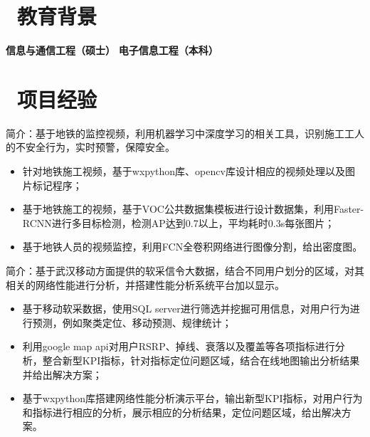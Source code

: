 \documentclass{resume}
\begin{document}



\section{\faGraduationCap\ \textbf{教育背景}}
 \qquad\qquad\textbf{信息与通信工程（硕士）}
 \qquad\qquad\textbf{电子信息工程（本科）}

\section{\faUsers\ \textbf{项目经验}}
\par{简介：基于地铁的监控视频，利用机器学习中深度学习的相关工具，识别施工工人的不安全行为，实时预警，保障安全。}
\begin{itemize}
  \item 针对地铁施工视频，基于wxpython库、opencv库设计相应的视频处理以及图片标记程序；
  \item 基于地铁施工的视频，基于VOC公共数据集模板进行设计数据集，利用Faster-RCNN进行多目标检测，检测AP达到0.7以上，平均耗时0.3s每张图片；
  \item 基于地铁人员的视频监控，利用FCN全卷积网络进行图像分割，给出密度图。
\end{itemize}

\par{简介：基于武汉移动方面提供的软采信令大数据，结合不同用户划分的区域，对其相关的网络性能进行分析，并搭建性能分析系统平台加以显示。}
\begin{itemize}
  \item 基于移动软采数据，使用SQL server进行筛选并挖掘可用信息，对用户行为进行预测，例如聚类定位、移动预测、规律统计；
  \item 利用google map api对用户RSRP、掉线、衰落以及覆盖等各项指标进行分析，整合新型KPI指标，针对指标定位问题区域，结合在线地图输出分析结果并给出解决方案；
  \item 基于wxpython库搭建网络性能分析演示平台，输出新型KPI指标，对用户行为和指标进行相应的分析，展示相应的分析结果，定位问题区域，给出解决方案。
\end{itemize}
\end{document}
